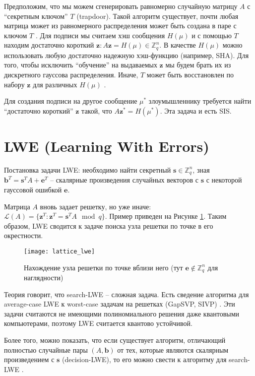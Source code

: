 Предположим, что мы можем сгенерировать равномерно случайную матрицу $A$ с ``секретным ключом'' $T$ (trapdoor). Такой алгоритм существует, почти любая матрица может из равномерного распределения может быть создана в паре с ключом $T$ \cite{short_basis_trapdoor}.
Для подписи мы считаем хэш сообщения $H(\mu)$ и с помощью $T$ находим достаточно короткий $\boldsymbol{z}: A \boldsymbol{z} = H(\mu) \in \mathds{Z}^n_q$.
В качестве $H(\mu)$ можно использовать любую достаточно надежную хэш-функцию (например, SHA).
Для того, чтобы исключить ``обучение'' на выдаваемых $\boldsymbol{z}$ мы будем брать их из дискретного гауссова распределения. Иначе, $T$ может быть восстановлен по набору $\boldsymbol{z}$ для различных $H(\mu)$ \cite{DN12}.

Для создания подписи на другое сообщение $\mu^*$ злоумышленнику требуется найти ``достаточно короткий'' $\boldsymbol{z}$ такой, что $A \boldsymbol{z^*} = H(\mu^*)$. Эта задача и есть SIS.

\section{LWE (Learning With Errors)}

Постановка задачи LWE: необходимо найти секретный $\boldsymbol{s} \in \mathds{Z}^n_q$, зная $\boldsymbol{b}^T = \bm{s}^T A + \bm{e}^T$ -- скалярные произведения случайных векторов с $\boldsymbol{s}$ с некоторой гауссовой ошибкой $\bm{e}$.

Матрица $A$ вновь задает решетку, но уже иначе: $\mathcal{L}(A) = \{ \boldsymbol{z}^T : \boldsymbol{z}^T = \boldsymbol{s}^T A \mod q\}$. Пример приведен на Рисунке \ref{fig:lattice_lwe}. Таким образом, LWE сводится к задаче поиска узла решетки по точке в его окрестности.

\begin{figure}[ht]
	\centering
	\texttt{[image: lattice\_lwe]}
	\caption{Нахождение узла решетки по точке вблизи него (тут $\bm{e} \notin \mathds{Z}^n_q$ для наглядности)}
	\label{fig:lattice_lwe}
\end{figure}

Теория говорит, что search-LWE -- сложная задача. Есть сведение алгоритма для average-case LWE к worst-case задачам на решетках (GapSVP, SIVP) \cite{Regev05}. Эти задачи считаются не имеющими полиномиального решения даже квантовыми компьютерами, поэтому LWE считается квантово устойчивой.

Более того, можно показать, что если существует алгоритм, отличающий полностью случайные пары $(A, \boldsymbol{b})$ от тех, которые являются скалярным произведением с $\boldsymbol{s}$ (decision-LWE), то его можно свести к алгоритму для search-LWE \cite{Regev05}.

